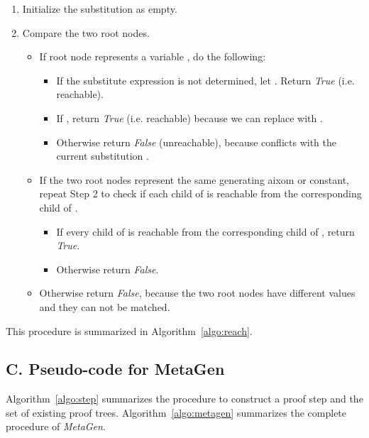 \documentclass{article}
\begin{document}
\begin{enumerate}
    \item Initialize the substitution  as empty.
    \item Compare the two root nodes.
    \begin{itemize}
        \item If root node  represents a variable , do the following:
            \begin{itemize}
                \item If the substitute expression  is not determined, let . Return \emph{True} (i.e. reachable). 
                \item If , return \emph{True} (i.e. reachable) because we can replace  with .   
                \item Otherwise return \emph{False} (unreachable), because  
                conflicts with the current substitution . 
            \end{itemize}
        \item If the two root nodes represent the same generating aixom or constant, 
            repeat Step 2 to check if each child of  is reachable from 
            the corresponding child of . 
            \begin{itemize}
                \item If every child of  is reachable 
                    from the corresponding child of , return \emph{True}.
                \item Otherwise return \emph{False}.
            \end{itemize}
        \item Otherwise return \emph{False}, because the two root nodes have different values and they can not be matched.
    \end{itemize}
\end{enumerate}


This procedure is summarized in Algorithm~\ref{algo:reach}. 


\subsection*{C. Pseudo-code for MetaGen}
\label{app:code}
Algorithm~\ref{algo:step} summarizes the procedure to construct a proof step and the set  of existing proof trees.
Algorithm~\ref{algo:metagen} summarizes the complete procedure of \emph{MetaGen}.
\end{document}
